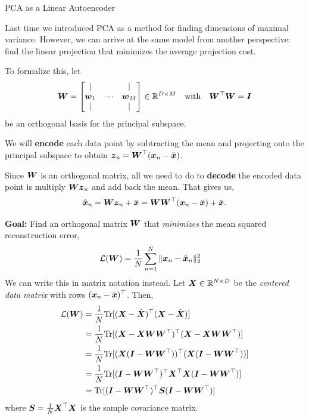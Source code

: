 \documentclass[aspectratio=169]{beamer}
\begin{document}
   
\begin{frame}[t,allowframebreaks]{PCA as a Linear
Autoencoder}\label{pca-as-a-linear-autoencoder}

Last time we introduced PCA as a method for finding dimensions of
maximal variance. However, we can arrive at the same model from another
perspective: find the linear projection that minimizes the average
projection cost.

To formalize this, let \begin{align*}
    \boldsymbol{W} = 
    \begin{bmatrix}
    | & & | \\
    \boldsymbol{w}_1 & \cdots & \boldsymbol{w}_M \\
    | & & |
    \end{bmatrix} \in \mathbb{R}^{D \times M} \quad \text{with} \quad \boldsymbol{W}^\top \boldsymbol{W} = \boldsymbol{I}
\end{align*} be an orthogonal basis for the principal subspace.

We will \textbf{encode} each data point by subtracting the mean and
projecting onto the principal subspace to obtain
\(\boldsymbol{z}_n = \boldsymbol{W}^\top (\boldsymbol{x}_n - \bar{\boldsymbol{x}})\).

Since \(\boldsymbol{W}\) is an orthogonal matrix, all we need to do to
\textbf{decode} the encoded data point is multiply \(\boldsymbol{W} \boldsymbol{z}_n\) and
add back the mean. That gives us, \begin{align*}
    \hat{\boldsymbol{x}}_n = \boldsymbol{W} \boldsymbol{z}_n + \bar{\boldsymbol{x}} = \boldsymbol{W} \boldsymbol{W}^\top (\boldsymbol{x}_n - \bar{\boldsymbol{x}}) + \bar{\boldsymbol{x}}.
\end{align*}

\textbf{Goal:} Find an orthogonal matrix \(\boldsymbol{W}\) that \emph{minimizes}
the mean squared reconstruction error, \begin{align*}
    \mathcal{L}(\boldsymbol{W}) &= \frac{1}{N} \sum_{n=1}^N \|\boldsymbol{x}_n - \hat{\boldsymbol{x}}_n\|_2^2
\end{align*} We can write this in matrix notation instead. Let
\(\boldsymbol{X} \in \mathbb{R}^{N \times D}\) be the \emph{centered data matrix} with
rows \((\boldsymbol{x}_n - \bar{\boldsymbol{x}})^\top\). Then, \begin{align*}
    \mathcal{L}(\boldsymbol{W}) 
    &= \frac{1}{N} \textrm{Tr}[(\boldsymbol{X} - \hat{\boldsymbol{X}})^\top (\boldsymbol{X} - \hat{\boldsymbol{X}})] \\
    &= \frac{1}{N} \textrm{Tr}[(\boldsymbol{X} - \boldsymbol{X} \boldsymbol{W} \boldsymbol{W}^\top)^\top (\boldsymbol{X} - \boldsymbol{X} \boldsymbol{W} \boldsymbol{W}^\top)] \\
    &= \frac{1}{N} \textrm{Tr}[(\boldsymbol{X}(\boldsymbol{I} - \boldsymbol{W} \boldsymbol{W}^\top))^\top (\boldsymbol{X} (\boldsymbol{I} - \boldsymbol{W} \boldsymbol{W}^\top))]\\
    &= \frac{1}{N} \textrm{Tr}[(\boldsymbol{I} - \boldsymbol{W} \boldsymbol{W}^\top)^\top \boldsymbol{X}^\top \boldsymbol{X} (\boldsymbol{I} - \boldsymbol{W} \boldsymbol{W}^\top)] \\
    &= \textrm{Tr}[(\boldsymbol{I} - \boldsymbol{W} \boldsymbol{W}^\top)^\top \boldsymbol{S} (\boldsymbol{I} - \boldsymbol{W} \boldsymbol{W}^\top)]
\end{align*} where \(\boldsymbol{S} = \frac{1}{N} \boldsymbol{X}^\top \boldsymbol{X}\) is the sample
covariance matrix.


\end{frame}
\end{document}
